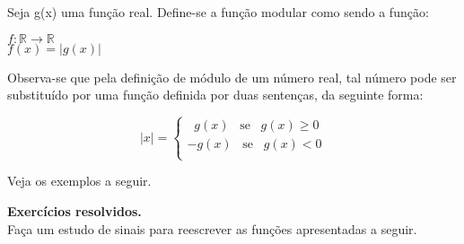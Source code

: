  
	Seja g(x) uma função real. Define-se a função modular como sendo a função:
    
   \begin{center}
        $f: \mathbb{R} \longrightarrow \mathbb{R}$ \\
        $f(x) = |g(x)|$
   \end{center}


    Observa-se que pela definição de módulo de um número real, tal número pode ser substituído por uma função definida por duas sentenças, da seguinte forma:
    
    \begin{tcolorbox}[colback=white,colframe=minha_cor,coltitle=black,title=Definição: Função modular] 
        \[
        {|x| = \left\{  
	       \begin{array}{c}
		     \;\; g(x) \;\;\; \text{se} \;\;\; g(x) \ge 0\\
		     -g(x) \;\;\; \text{se} \;\;\; g(x) < 0\\
	       \end{array} 
	       \right.
        }
        \]
        \end{tcolorbox}

        Veja os exemplos a seguir.
        \begin{texample}
        \centering
        \end{texample}
        
        \noindent
		\textbf{Exercícios resolvidos.}\\
  
        Faça um estudo de sinais para reescrever as funções apresentadas a seguir.

